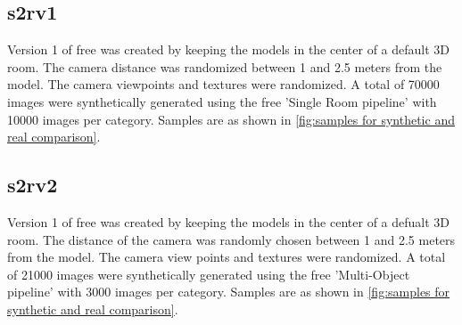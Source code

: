 \subsection{\gls{s2rv1}}\label{subsec:gls{free}-version-1}
Version 1 of \gls{free} was created by keeping the models in the center of a default 3D room.
The camera distance was randomized between 1 and 2.5 meters from the model.
The camera viewpoints and textures were randomized.
A total of 70000 images were synthetically generated using the \gls{free} 'Single Room pipeline' with 10000 images per category.
Samples are as shown in \autoref{fig:samples for synthetic and real comparison}.

\subsection{\gls{s2rv2}}\label{subsec:gls{free}-version-2}
Version 1 of \gls{free} was created by keeping the models in the center of a defualt 3D room.
The distance of the camera was randomly chosen between 1 and 2.5 meters from the model.
The camera view points and textures were randomized.
A total of 21000 images were synthetically generated using the \gls{free} 'Multi-Object pipeline' with 3000 images per category.
Samples are as shown in \autoref{fig:samples for synthetic and real comparison}.

